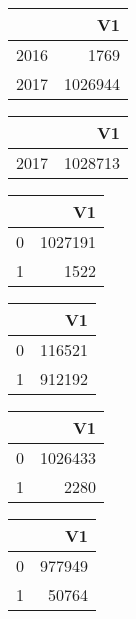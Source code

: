 \bigskip\bigskip
\centering
\begin{tabular}{rr}
  \hline
 & V1 \\ 
  \hline
2016 & 1769 \\ 
  2017 & 1026944 \\ 
   \hline
\end{tabular}

\bigskip\bigskip
\centering
\begin{tabular}{rr}
  \hline
 & V1 \\ 
  \hline
2017 & 1028713 \\ 
   \hline
\end{tabular}

\bigskip\bigskip
\centering
\begin{tabular}{rr}
  \hline
 & V1 \\ 
  \hline
0 & 1027191 \\ 
  1 & 1522 \\ 
   \hline
\end{tabular}

\bigskip\bigskip
\centering
\begin{tabular}{rr}
  \hline
 & V1 \\ 
  \hline
0 & 116521 \\ 
  1 & 912192 \\ 
   \hline
\end{tabular}

\bigskip\bigskip
\centering
\begin{tabular}{rr}
  \hline
 & V1 \\ 
  \hline
0 & 1026433 \\ 
  1 & 2280 \\ 
   \hline
\end{tabular}

\bigskip\bigskip
\centering
\begin{tabular}{rr}
  \hline
 & V1 \\ 
  \hline
0 & 977949 \\ 
  1 & 50764 \\ 
   \hline
\end{tabular}

